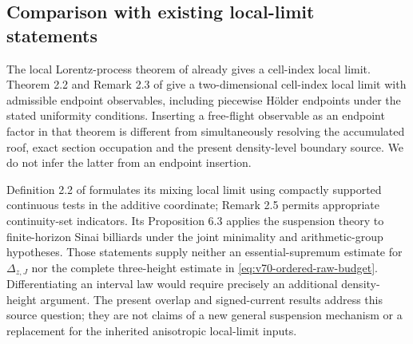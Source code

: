 \subsection{Comparison with existing local-limit statements}
The local Lorentz-process theorem of \cite{SV} already gives a
cell-index local limit. Theorem 2.2 and Remark 2.3 of \cite{DPZ}
give a two-dimensional cell-index local limit with admissible endpoint
observables, including piecewise H\"older endpoints under the stated
uniformity conditions. Inserting a free-flight observable as an
endpoint factor in that theorem is different from simultaneously
resolving the accumulated roof, exact section occupation and the
present density-level boundary source. We do not infer the latter
from an endpoint insertion.

Definition 2.2 of \cite{DN} formulates its mixing local limit using
compactly supported continuous tests in the additive coordinate;
Remark 2.5 permits appropriate continuity-set indicators. Its
Proposition 6.3 applies the suspension theory to finite-horizon Sinai
billiards under the joint minimality and arithmetic-group hypotheses.
Those statements supply neither an essential-supremum estimate for
$\Delta_{z,J}$ nor the complete three-height estimate in
\eqref{eq:v70-ordered-raw-budget}. Differentiating an interval law
would require precisely an additional density-height argument.
The present overlap and signed-current results address this source
question; they are not claims of a new general suspension mechanism
or a replacement for the inherited anisotropic local-limit inputs.
\label{end:v70-new-mathematics}
